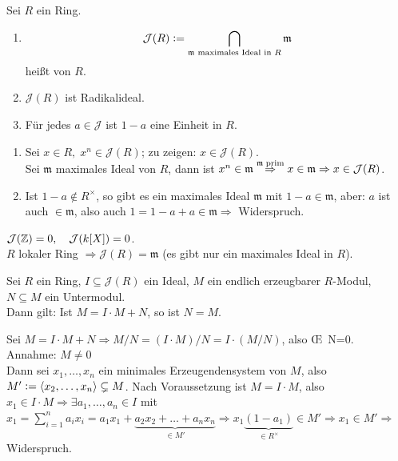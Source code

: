 \documentclass[a4paper, 10pt]{report}
\begin{document}
\begin{DefBem}

Sei $R$ ein Ring.
\begin{enumerate}
	\item $$\mathcal{J}(R) \mathrel{\mathop:}= \bigcap_{\mathfrak{m}\text{\scriptsize\ maximales Ideal in }R}\mathfrak{m}$$ heißt  von $R$.
	\item $\mathcal{J}(R)$ ist Radikalideal.
	\item Für jedes $a \in \mathcal{J}$ ist $1-a$ eine Einheit in $R$.
\end{enumerate}

\end{DefBem}

\begin{Bew}

\begin{enumerate}
	\item Sei $x \in R, \; x^n \in \mathcal{J}(R)$; zu zeigen: $x \in \mathcal{J}(R)$.\\
	Sei $\mathfrak{m}$ maximales Ideal von $R$, dann ist $x^n \in \mathfrak{m}
	\overset{\mathfrak{m} \; \text{\scriptsize prim}}{\Rightarrow} x \in
	\mathfrak{m} \Rightarrow x \in \mathcal{J}(R)$.
	\item Ist $1-a \notin R^{\times}$, so gibt es ein maximales Ideal
	$\mathfrak{m}$ mit $1-a \in \mathfrak{m}$, aber: $a$ ist auch $\in
	\mathfrak{m}$, also auch $1 = 1-a+a \in \mathfrak{m} \Rightarrow$ Widerspruch.
\end{enumerate}
\end{Bew}

\begin{nnBsp}
  $\mathcal{J}(\mathbb{Z}) = 0, \quad \mathcal{J}(k[X]) = 0$.\\
  $R$ lokaler Ring $\Rightarrow \mathcal{J}(R) = \mathfrak{m}$ (es gibt nur ein
  maximales Ideal in $R$).
\end{nnBsp}

\begin{Satz}
\label{Satz8}
  Sei $R$ ein Ring, $I \subseteq \mathcal{J}(R)$ ein Ideal, $M$ ein endlich erzeugbarer $R$-Modul, $N \subseteq M$ ein Untermodul.\\
  Dann gilt: Ist $M = I \cdot M + N$, so ist $N = M$.
\end{Satz}

\begin{Bew}
  Sei $M=I \cdot M + N \Rightarrow M/N = (I \cdot M)/N = I \cdot (M/N)$, also \OE\ N=0.\\
  Annahme: $M \not= 0$\\
  Dann sei $x_1, \dots, x_n$ ein minimales Erzeugendensystem von $M$, also $M' \mathrel{\mathop:}= \langle x_2, \dots, x_n\rangle \subsetneq M$.
  Nach Voraussetzung ist $M = I \cdot M$, also $x_1 \in I \cdot M \Rightarrow
  \exists a_1, \dots, a_n \in I$ mit $x_1 = \sum_{i=1}^n a_i x_i = a_1 x_1 +
  \underset{\in M'}{\underbrace{a_2 x_2 + \dots + a_n x_n}} \Rightarrow
  x_1\underset{\in R^{\times}}{\underbrace{(1-a_1)}} \in M' \Rightarrow x_1 \in
  M' \Rightarrow$ Widerspruch.
\end{Bew}
\end{document}
